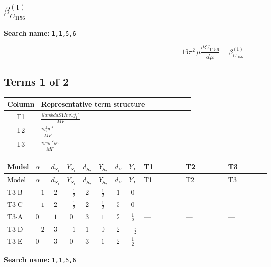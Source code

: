 \documentclass[8pt]{article}
\begin{document}
\begin{landscape}
\section*{$\beta_{C_{1156}}^{(1)}$}
\noindent\textbf{Search name: }\texttt{1,1,5,6}\par\smallskip
\[16\pi^2\,\mu\frac{d C_{1156}}{d\mu}=\beta_{C_{1156}}^{(1)}\]
\subsection*{Terms 1 of 2}
\begin{center}
\begin{tabular}{@{}c >{\raggedright\arraybackslash}p{0.82\linewidth}@{}}
\toprule
Column & Representative term structure \\
\midrule
T1 & \(\displaystyle \frac{i lambdaS1Inv1 \overline{y_{1}}^{2}}{MF}\) \\
\midrule
T2 & \(\displaystyle \frac{i g_{2}^{2} \overline{y_{1}}^{2}}{MF}\) \\
\midrule
T3 & \(\displaystyle \frac{i ye \overline{y_{1}}^{2} \overline{ye}}{MF}\) \\
\midrule
\bottomrule
\end{tabular}
\end{center}
\smallskip
\tiny
\begin{longtable}{@{}llcccccc >{\raggedright\arraybackslash}p{0.21\linewidth} >{\raggedright\arraybackslash}p{0.21\linewidth} >{\raggedright\arraybackslash}p{0.21\linewidth}@{}}
\toprule
Model & $\alpha$ & $d_{S_1}$ & $Y_{S_1}$ & $d_{S_2}$ & $Y_{S_2}$ & $d_F$ & $Y_F$ & T1 & T2 & T3 \\
\midrule
\endfirsthead
\toprule
Model & $\alpha$ & $d_{S_1}$ & $Y_{S_1}$ & $d_{S_2}$ & $Y_{S_2}$ & $d_F$ & $Y_F$ & T1 & T2 & T3 \\
\midrule
\endhead
T3-B & $-1$ & $2$ & $-\frac{1}{2}$ & $2$ & $\frac{1}{2}$ & $1$ & $0$ & \scriptsize\adjustbox{max width=\linewidth}{$\begin{gathered} \frac{i lambdaS1Inv1 \overline{y_{1}}^{2}}{2 MF}\end{gathered}$} & \scriptsize\adjustbox{max width=\linewidth}{$\begin{gathered} \frac{3 i g_{2}^{2} \overline{y_{1}}^{2}}{4 MF}\end{gathered}$} & \scriptsize\adjustbox{max width=\linewidth}{$\begin{gathered} - \frac{i ye \overline{y_{1}}^{2} \overline{ye}}{4 MF}\end{gathered}$} \\
\midrule
T3-C & $-1$ & $2$ & $-\frac{1}{2}$ & $2$ & $\frac{1}{2}$ & $3$ & $0$ & --- & --- & --- \\
\midrule
T3-A & $0$ & $1$ & $0$ & $3$ & $1$ & $2$ & $\frac{1}{2}$ & --- & --- & --- \\
\midrule
T3-D & $-2$ & $3$ & $-1$ & $1$ & $0$ & $2$ & $-\frac{1}{2}$ & --- & --- & --- \\
\midrule
T3-E & $0$ & $3$ & $0$ & $3$ & $1$ & $2$ & $\frac{1}{2}$ & --- & --- & --- \\
\midrule
\bottomrule
\end{longtable}
\clearpage
\noindent\textbf{Search name: }\texttt{1,1,5,6}\par\smallskip

\end{landscape}
\end{document}
